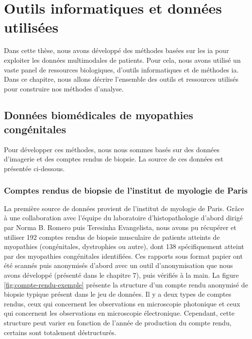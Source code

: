 \chapter{Outils informatiques et données utilisées}

Dans cette thèse, nous avons développé des méthodes basées sur les \gls{ia} pour exploiter les données multimodales de patients. Pour cela, nous avons utilisé un vaste panel de ressources biologiques, d'outils informatiques et de méthodes \gls{ia}. Dans ce chapitre, nous allons décrire l'ensemble des outils et ressources utilisés pour construire nos méthodes d'analyse.

\section{Données biomédicales de myopathies congénitales}
Pour développer ces méthodes, nous nous sommes basés sur des données d'imagerie et des comptes rendus de biopsie. La source de ces données est présentée ci-dessous.

\subsection{Comptes rendus de biopsie de l'institut de myologie de Paris}
La première source de données provient de l'institut de myologie de Paris. Grâce à une collaboration avec l'équipe du laboratoire d’histopathologie d'abord dirigé par Norma B. Romero puis Teresinha Evangelista, nous avons pu récupérer et utiliser 192 comptes rendus de biopsie musculaire de patients atteints de myopathies (congénitales, dystrophies ou autre), dont 138 spécifiquement atteint par des myopathies congénitales identifiées. Ces rapports sous format papier ont été scannés puis anonymisés d'abord avec un outil d'anonymisation que nous avons développé (présenté dans le chapitre 7), puis vérifiés à la main. La figure \ref{fig:compte-rendu-exemple} présente la structure d'un compte rendu anonymisé de biopsie typique présent dans le jeu de données. Il y a deux types de comptes rendus, ceux qui concernent les observations en microscopie photonique et ceux qui concernent les observations en microscopie électronique. Cependant, cette structure peut varier en fonction de l'année de production du compte rendu, certains sont totalement déstructurés.

